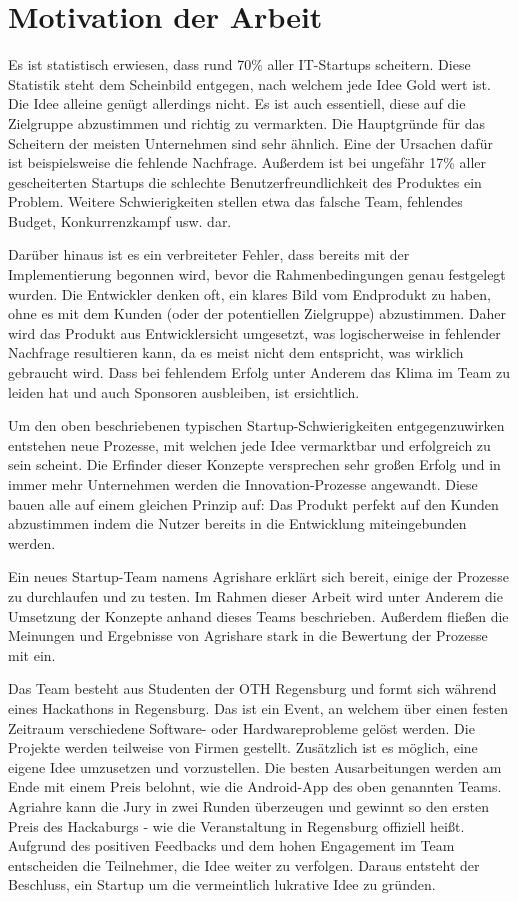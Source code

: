 \section{Motivation der Arbeit}
Es ist statistisch erwiesen, dass rund 70\% aller IT-Startups scheitern. \cite{CBInsights_failure} Diese Statistik steht dem Scheinbild entgegen, nach welchem jede Idee Gold wert ist. Die Idee alleine genügt allerdings nicht. Es ist auch essentiell, diese auf die Zielgruppe abzustimmen und richtig zu vermarkten. Die Hauptgründe für das Scheitern der meisten Unternehmen sind sehr ähnlich. Eine der Ursachen dafür ist beispielsweise die fehlende Nachfrage. Außerdem ist bei ungefähr 17\% aller gescheiterten Startups die schlechte Benutzerfreundlichkeit des Produktes ein Problem. Weitere Schwierigkeiten stellen etwa das falsche Team, fehlendes Budget, Konkurrenzkampf usw. dar. \cite{CBInsights_reasons}

Darüber hinaus ist es ein verbreiteter Fehler, dass bereits mit der Implementierung begonnen wird, bevor die Rahmenbedingungen genau festgelegt wurden. Die Entwickler denken oft, ein klares Bild vom Endprodukt zu haben, ohne es mit dem Kunden (oder der potentiellen Zielgruppe) abzustimmen. Daher wird das Produkt aus Entwicklersicht umgesetzt, was logischerweise in fehlender Nachfrage resultieren kann, da es meist nicht dem entspricht, was wirklich gebraucht wird. Dass bei fehlendem Erfolg unter Anderem das Klima im Team zu leiden hat und auch Sponsoren ausbleiben, ist ersichtlich. 

Um den oben beschriebenen typischen Startup-Schwierigkeiten entgegenzuwirken entstehen neue Prozesse, mit welchen jede Idee vermarktbar und erfolgreich zu sein scheint. Die Erfinder dieser Konzepte versprechen sehr großen Erfolg und in immer mehr Unternehmen werden die Innovation-Prozesse angewandt. Diese bauen alle auf einem gleichen Prinzip auf: Das Produkt perfekt auf den Kunden abzustimmen indem die Nutzer bereits in die Entwicklung miteingebunden werden.

Ein neues Startup-Team namens Agrishare erklärt sich bereit, einige der Prozesse zu durchlaufen und zu testen. Im Rahmen dieser Arbeit wird unter Anderem die Umsetzung der Konzepte anhand dieses Teams beschrieben. Außerdem fließen die Meinungen und Ergebnisse von Agrishare stark in die Bewertung der Prozesse mit ein.

Das Team besteht aus Studenten der OTH Regensburg und formt sich während eines Hackathons in Regensburg. Das ist ein Event, an welchem über einen festen Zeitraum verschiedene Software- oder Hardwareprobleme gelöst werden. Die Projekte werden teilweise von Firmen gestellt. Zusätzlich ist es möglich, eine eigene Idee umzusetzen und vorzustellen. Die besten Ausarbeitungen werden am Ende mit einem Preis belohnt, wie die Android-App des oben genannten Teams. Agriahre kann die Jury in zwei Runden überzeugen und gewinnt so den ersten Preis des Hackaburgs - wie die Veranstaltung in Regensburg offiziell heißt. Aufgrund des positiven Feedbacks und dem hohen Engagement im Team entscheiden die Teilnehmer, die Idee weiter zu verfolgen. Daraus entsteht der Beschluss, ein Startup um die vermeintlich lukrative Idee zu gründen.

